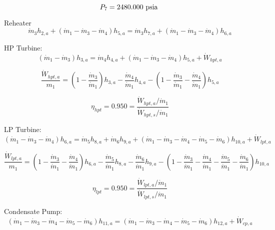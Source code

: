 \documentclass{article}
\begin{document}
\begin{equation}
P_{ 7} = 2480.000\textnormal{ psia                      }
\end{equation}


Reheater
\begin{equation}
\dot{m}_{ 3}h_{ 2,a} + (\dot{m}_{ 1} - \dot{m}_{ 3} - \dot{m}_{ 4})h_{ 5,a} = \dot{m}_{ 3}h_{ 7,a} + (\dot{m}_{ 1} - \dot{m}_{ 3} - \dot{m}_{ 4})h_{ 6,a}
\end{equation}


HP Turbine:
\begin{equation}
(\dot{m}_{ 1} - \dot{m}_{ 3})h_{ 3,a} = \dot{m}_{ 4}h_{ 4,a} + (\dot{m}_{ 1} - \dot{m}_{ 3} - \dot{m}_{ 4})h_{ 5,a} + \dot{W}_{hpt,a}
\end{equation}

\begin{equation}
\frac{\dot{W}_{hpt,a}}{m_1} = (1 - \frac{\dot{m}_{ 3}}{\dot{m}_{ 1}})h_{ 3,a} - \frac{\dot{m}_{ 4}}{\dot{m}_{ 1}}h_{ 4,a} - (1 - \frac{\dot{m}_{ 3}}{\dot{m}_{ 1}} - \frac{\dot{m}_{ 4}}{\dot{m}_{ 1}})h_{ 5,a}\end{equation}

\begin{equation}
\eta_{hpt} =    0.950 = \frac{\dot{W}_{hpt,a} / \dot{m}_{1}}{\dot{W}_{hpt,s} / \dot{m}_{1}}
\end{equation}


LP Turbine:
\begin{equation}
(\dot{m}_{ 1} - \dot{m}_{ 3} - \dot{m}_{ 4})h_{ 6,a} = \dot{m}_{ 5}h_{ 8,a} + \dot{m}_{ 6}h_{ 9,a} + (\dot{m}_{ 1} - \dot{m}_{ 3} - \dot{m}_{ 4} - \dot{m}_{ 5} - \dot{m}_{ 6})h_{10,a} + \dot{W}_{lpt,a}
\end{equation}

\begin{equation}
\frac{\dot{W}_{lpt,a}}{m_1} = (1 - \frac{\dot{m}_{ 3}}{\dot{m}_{ 1}} - \frac{\dot{m}_{ 4}}{\dot{m}_{ 1}})h_{ 6,a} - \frac{\dot{m}_{ 5}}{\dot{m}_{ 1}}h_{ 8,a} - \frac{\dot{m}_{ 6}}{\dot{m}_{ 1}}h_{ 9,a} - (1 - \frac{\dot{m}_{ 3}}{\dot{m}_{ 1}} - \frac{\dot{m}_{ 4}}{\dot{m}_{ 1}} - \frac{\dot{m}_{ 5}}{\dot{m}_{ 1}} - \frac{\dot{m}_{ 6}}{\dot{m}_{ 1}})h_{10,a}\end{equation}

\begin{equation}
\eta_{lpt} =    0.950 = \frac{\dot{W}_{lpt,a} / \dot{m}_{1}}{\dot{W}_{lpt,s} / \dot{m}_{1}}
\end{equation}


Condensate Pump:
\begin{equation}
(\dot{m}_{ 1} - \dot{m}_{ 3} - \dot{m}_{ 4} - \dot{m}_{ 5} - \dot{m}_{ 6})h_{11,a} = (\dot{m}_{ 1} - \dot{m}_{ 3} - \dot{m}_{ 4} - \dot{m}_{ 5} - \dot{m}_{ 6})h_{12,a} + \dot{W}_{cp ,a}
\end{equation}
\end{document}
